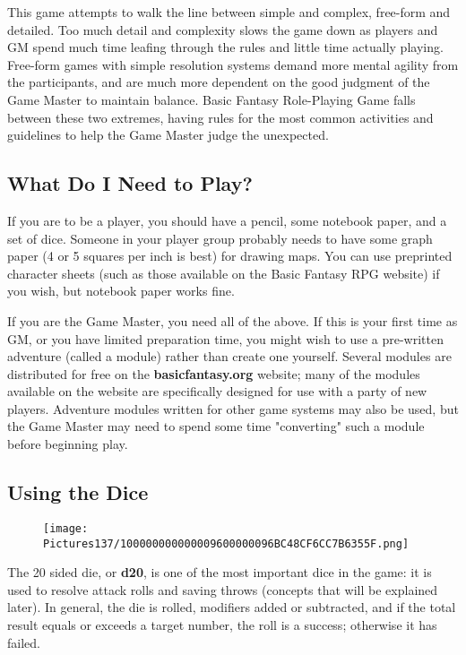 \documentclass[a4paper,twoside,openany,10pt]{book}
\begin{document}
\begin{multicols}{2}
This game attempts to walk the line between simple and complex, free-form and detailed. Too much detail and complexity slows the game down as players and GM spend much time leafing through the rules and little time actually playing. Free-form games with simple resolution systems demand more mental agility from the participants, and are much more dependent on the good judgment of the Game Master to maintain balance. Basic Fantasy Role-Playing Game falls between these two extremes, having rules for the most common activities and guidelines to help the Game Master judge the unexpected.

\subsection{What Do I Need to Play?}\label{what-do-i-need-to-play}

If you are to be a player, you should have a pencil, some notebook paper, and a set of dice. Someone in your player group probably needs to have some graph paper (4 or 5 squares per inch is best) for drawing maps. You can use preprinted character sheets (such as those available on the Basic Fantasy RPG website) if you wish, but notebook paper works fine.

If you are the Game Master, you need all of the above. If this is your first time as GM, or you have limited preparation time, you might wish to use a pre-written adventure (called a module) rather than create one yourself. Several modules are distributed for free on the \textbf{basicfantasy.org} website; many of the modules available on the website are specifically designed for use with a party of new players. Adventure modules written for other game systems may also be used, but the Game Master may need to spend some time "converting" such a module before beginning play.

\bigskip

\subsection{Using the Dice}\label{using-the-dice}

\begin{wrapfigure}{r}{1.77cm}
	\texttt{[image: Pictures137/100000000000009600000096BC48CF6CC7B6355F.png]}
\end{wrapfigure}
The 20 sided die, or \textbf{d20}, is one of the most important dice in the
game: it is used to resolve attack rolls and saving throws (concepts
that will be explained later).  In general, the die is rolled, modifiers added or subtracted, and if the total result equals or exceeds a target number, the roll is a success; otherwise it has failed.


\end{multicols}
\end{document}
